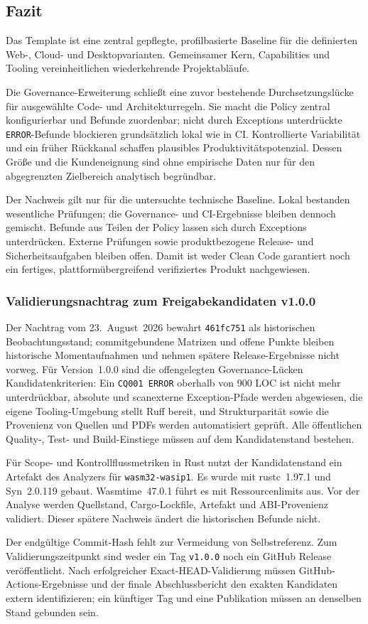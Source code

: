 \subsection{Fazit}
\label{subsec:fazit}

Das Template ist eine zentral gepflegte, profilbasierte Baseline für die
definierten Web-, Cloud- und Desktopvarianten. Gemeinsamer Kern, Capabilities
und Tooling vereinheitlichen wiederkehrende Projektabläufe.

Die Governance-Erweiterung schließt eine zuvor bestehende Durchsetzungslücke
für ausgewählte Code- und Architekturregeln. Sie macht die Policy zentral
konfigurierbar und Befunde zuordenbar; nicht durch Exceptions unterdrückte
\texttt{ERROR}-Befunde blockieren grundsätzlich lokal wie in CI. Kontrollierte
Variabilität und ein früher Rückkanal schaffen
plausibles Produktivitätspotenzial. Dessen Größe und die Kundeneignung sind
ohne empirische Daten nur für den abgegrenzten Zielbereich analytisch
begründbar.

Der Nachweis gilt nur für die untersuchte technische Baseline. Lokal bestanden
wesentliche Prüfungen; die Governance- und CI-Ergebnisse bleiben dennoch
gemischt. Befunde aus Teilen der Policy lassen sich durch Exceptions
unterdrücken. Externe Prüfungen sowie
produktbezogene Release- und Sicherheitsaufgaben bleiben offen. Damit ist weder
Clean Code garantiert noch ein fertiges, plattformübergreifend verifiziertes
Produkt nachgewiesen.

\subsubsection*{Validierungsnachtrag zum Freigabekandidaten v1.0.0}
\begingroup
\ifbeginnerstatements\fontsize{9pt}{10.8pt}\selectfont\fi
Der Nachtrag vom 23.~August~2026 bewahrt \texttt{461fc751} als historischen
Beobachtungsstand; commitgebundene Matrizen und offene Punkte bleiben
historische Momentaufnahmen und nehmen spätere Release-Ergebnisse nicht vorweg. Für
Version~1.0.0 sind die offengelegten Governance-Lücken Kandidatenkriterien: Ein
\texttt{CQ001 ERROR} oberhalb von 900 LOC ist nicht mehr unterdrückbar,
absolute und scanexterne Exception-Pfade werden abgewiesen, die eigene
Tooling-Umgebung stellt Ruff bereit, und Strukturparität sowie die Provenienz
von Quellen und PDFs werden automatisiert geprüft. Alle öffentlichen Quality-,
Test- und Build-Einstiege müssen auf dem Kandidatenstand bestehen.

Für Scope- und Kontrollflussmetriken in Rust nutzt der Kandidatenstand ein
Artefakt des Analyzers für \texttt{wasm32-wasip1}. Es wurde mit rustc~1.97.1
und Syn~2.0.119 gebaut. Wasmtime~47.0.1 führt es mit Ressourcenlimits aus. Vor
der Analyse werden Quellstand, Cargo-Lockfile, Artefakt und ABI-Provenienz
validiert. Dieser spätere Nachweis ändert die historischen Befunde nicht.

Der endgültige Commit-Hash fehlt zur Vermeidung von Selbstreferenz. Zum
Validierungszeitpunkt sind weder ein Tag \texttt{v1.0.0} noch ein GitHub
Release veröffentlicht. Nach erfolgreicher Exact-HEAD-Validierung müssen
GitHub-Actions-Ergebnisse und der finale Abschlussbericht den exakten
Kandidaten extern identifizieren; ein künftiger Tag und eine Publikation
müssen an denselben Stand gebunden sein.
\endgroup
